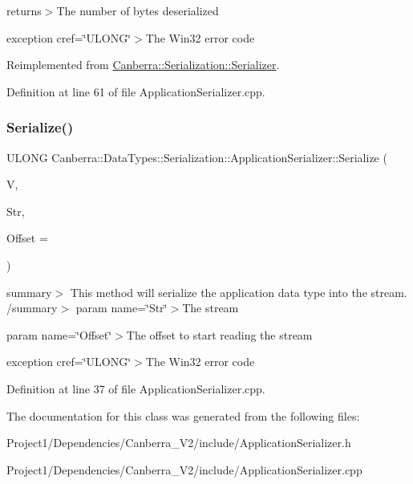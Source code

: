 returns$>$The number of bytes deserialized

exception cref=\char`\"{}\+U\+L\+O\+N\+G\char`\"{}$>$The Win32 error code

Reimplemented from \hyperlink{class_canberra_1_1_serialization_1_1_serializer_af6bce5a6f7a663d86cb305ef34a5c631_af6bce5a6f7a663d86cb305ef34a5c631}{Canberra\+::\+Serialization\+::\+Serializer}.



Definition at line 61 of file Application\+Serializer.\+cpp.

\mbox{\label{class_canberra_1_1_data_types_1_1_serialization_1_1_application_serializer_aba7a88cedf211a3e47d3efd4bf2e735e_aba7a88cedf211a3e47d3efd4bf2e735e}} 
\subsubsection{\texorpdfstring{Serialize()}{Serialize()}\hspace{0.1cm}{\footnotesize\ttfamily [2/2]}}
{\footnotesize\ttfamily U\+L\+O\+NG Canberra\+::\+Data\+Types\+::\+Serialization\+::\+Application\+Serializer\+::\+Serialize (\begin{DoxyParamCaption}\item[{const \hyperlink{class_canberra_1_1_serialization_1_1_serializable_object}{Canberra\+::\+Serialization\+::\+Serializable\+Object} \&}]{V,  }\item[{\hyperlink{class_canberra_1_1_utility_1_1_core_1_1_byte_stream}{Canberra\+::\+Utility\+::\+Core\+::\+Byte\+Stream} \&}]{Str,  }\item[{const L\+O\+NG}]{Offset = {} }\end{DoxyParamCaption})}

summary$>$ This method will serialize the application data type into the stream. /summary$>$ param name=\char`\"{}\+Str\char`\"{}$>$The stream

param name=\char`\"{}\+Offset\char`\"{}$>$The offset to start reading the stream

exception cref=\char`\"{}\+U\+L\+O\+N\+G\char`\"{}$>$The Win32 error code

Definition at line 37 of file Application\+Serializer.\+cpp.



The documentation for this class was generated from the following files\+:\begin{DoxyCompactItemize}
\item 
Project1/\+Dependencies/\+Canberra\+\_\+\+V2/include/Application\+Serializer.\+h\item 
Project1/\+Dependencies/\+Canberra\+\_\+\+V2/include/Application\+Serializer.\+cpp\end{DoxyCompactItemize}
